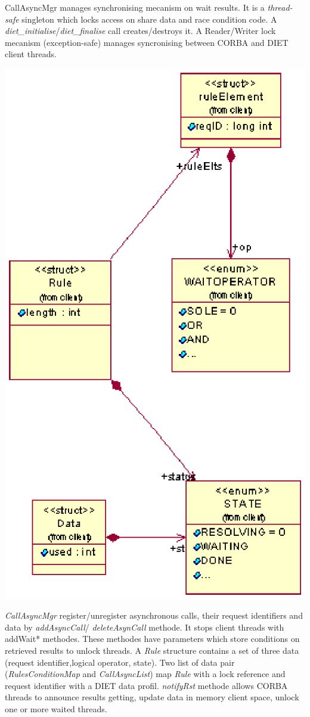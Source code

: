   CallAsyncMgr manages synchronising mecanism on wait results. It is a \emph{thread-safe}
  singleton which locks access on share data and race condition code. A 
  \emph{diet\_initialise}/\emph{diet\_finalise} call creates/destroys it. A
  Reader/Writer lock mecanism (exception-safe) manages syncronising between
  CORBA and DIET client threads. 

  \includegraphics{./fig/WaitRulesClassDiagram.ps}

  \emph{CallAsyncMgr} register/unregister asynchronous calls, their request
  identifiers and data by \emph{addAsyncCall}/ \emph{deleteAsynCall} methode.
  It stops client threads with addWait* methodes. These methodes have 
  parameters which store conditions on retrieved results to unlock threads.
  A \emph{Rule} structure contains a set of three data (request identifier,logical operator, state).
  Two list of data pair (\emph{RulesConditionMap} and \emph{CallAsyncList}) map \emph{Rule} with a
  lock reference and request identifier with a DIET data
  profil. \emph{notifyRst} methode allows CORBA threads to announce results getting,
  update data in memory client space, unlock one or more waited threads.

